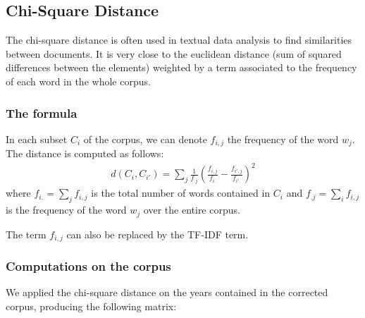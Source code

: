 \subsection{Chi-Square Distance}

The chi-square distance is often used in textual data analysis to find similarities between documents. It is very close to the euclidean distance (sum of squared differences between the elements) weighted by a term associated to the frequency of each word in the whole corpus.

\subsubsection{The formula}

In each subset $C_i$ of the corpus, we can denote $f_{i,j}$ the frequency of the word $w_j$. The distance is computed as follows:
\begin{eqnarray}
 d(C_i,C_{i'}) = \sum_j \frac{1}{f_{.j}} (\frac{f_{i,j}}{f_{i.}} - \frac{f_{i',j}}{f_{i'.}})^2
\end{eqnarray}
where $f_{i.} = \sum_j f_{i,j}$ is the total number of words contained in $C_i$ and $f_{.j} = \sum_i f_{i,j}$ is the frequency of the word $w_j$ over the entire corpus.

The term $f_{i,j}$ can also be replaced by the TF-IDF term.

\subsubsection{Computations on the corpus}

We applied the chi-square distance on the years contained in the corrected corpus, producing the following matrix:

